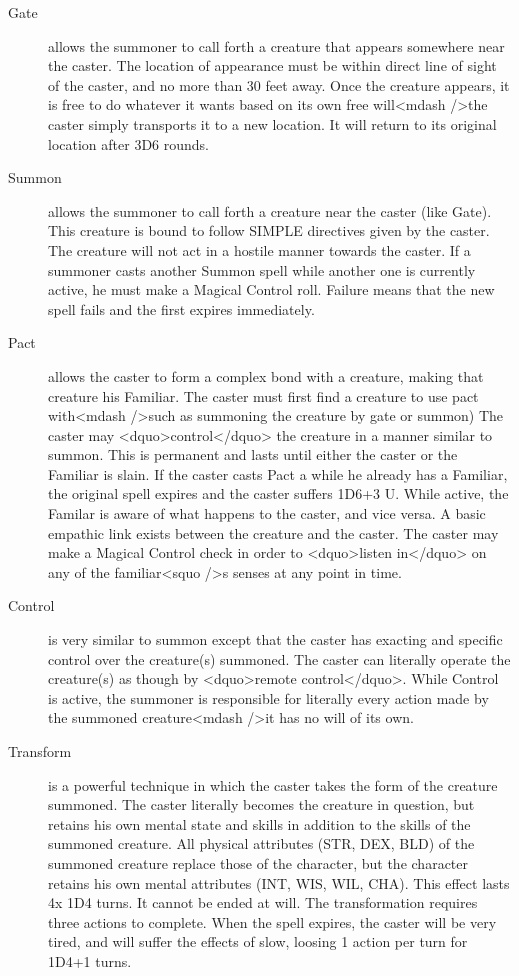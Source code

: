 \begin{description}
\item[Gate] allows the summoner to call forth a creature that appears
  somewhere near the caster.  The location of appearance must be
  within direct line of sight of the caster, and no more than 30 feet
  away.  Once the creature appears, it is free to do whatever it wants
  based on its own free will<mdash />the caster simply transports it to a
  new location.  It will return to its original location after 3D6
  rounds.

\item[Summon] allows the summoner to call forth a creature near the
  caster (like Gate).  This creature is bound to follow SIMPLE
  directives given by the caster.  The creature will not act in a
  hostile manner towards the caster.  If a summoner casts another
  Summon spell while another one is currently active, he must make a
  Magical Control roll.  Failure means that the new spell fails and
  the first expires immediately.

\item[Pact] allows the caster to form a complex bond with a creature,
  making that creature his Familiar.  The caster must first find a
  creature to use pact with<mdash />such as summoning the creature by gate
  or summon) The caster may <dquo>control</dquo> the creature in a manner
  similar to summon.  This is permanent and lasts until either the
  caster or the Familiar is slain.  If the caster casts Pact a while
  he already has a Familiar, the original spell expires and the caster
  suffers 1D6+3 U.  While active, the Familar is aware of what happens
  to the caster, and vice versa.  A basic empathic link exists between
  the creature and the caster.  The caster may make a Magical Control
  check in order to <dquo>listen in</dquo> on any of the familiar<squo />s senses at
  any point in time.

\item[Control] is very similar to summon except that the caster has
  exacting and specific control over the creature(s) summoned.  The
  caster can literally operate the creature(s) as though by <dquo>remote
  control</dquo>.  While Control is active, the summoner is responsible for
  literally every action made by the summoned creature<mdash />it has no
  will of its own.

\item[Transform] is a powerful technique in which the caster takes the
  form of the creature summoned.  The caster literally becomes the
  creature in question, but retains his own mental state and skills in
  addition to the skills of the summoned creature.  All physical
  attributes (STR, DEX, BLD) of the summoned creature replace those of
  the character, but the character retains his own mental attributes
  (INT, WIS, WIL, CHA).  This effect lasts 4x 1D4 turns.  It cannot be
  ended at will.  The transformation requires three actions to
  complete.  When the spell expires, the caster will be very tired,
  and will suffer the effects of slow, loosing 1 action per turn for
  1D4+1 turns.


\end{description}

